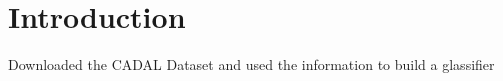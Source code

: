 \chapter{Introduction}

Downloaded the CADAL Dataset\cite{Gao_2012} and used the information to build a glassifier














